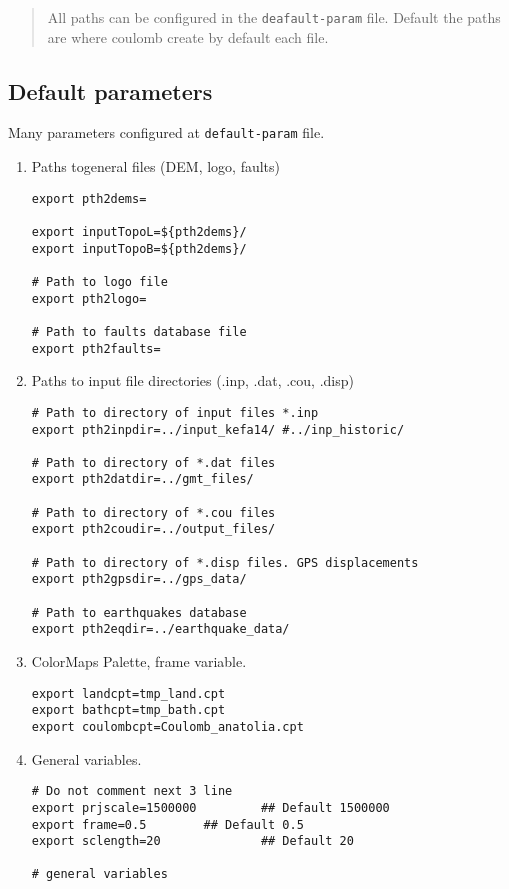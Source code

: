 \begin{quote}
All paths can be configured in the \texttt{deafault-param} file. Default
the paths are where coulomb create by default each file.
\end{quote}

\subsection{Default parameters}\label{default-parameters}

Many parameters configured at \texttt{default-param} file. 
\begin{enumerate}
\item  Paths togeneral files (DEM, logo, faults) 
\begin{verbatim}
export pth2dems=

export inputTopoL=${pth2dems}/
export inputTopoB=${pth2dems}/

# Path to logo file
export pth2logo=

# Path to faults database file
export pth2faults=
\end{verbatim}
\item Paths to input file directories (.inp, .dat, .cou, .disp)
\begin{verbatim}
# Path to directory of input files *.inp
export pth2inpdir=../input_kefa14/ #../inp_historic/

# Path to directory of *.dat files
export pth2datdir=../gmt_files/

# Path to directory of *.cou files
export pth2coudir=../output_files/

# Path to directory of *.disp files. GPS displacements
export pth2gpsdir=../gps_data/

# Path to earthquakes database
export pth2eqdir=../earthquake_data/

\end{verbatim} 
\item ColorMaps Palette, frame variable. 
\begin{verbatim}
export landcpt=tmp_land.cpt
export bathcpt=tmp_bath.cpt
export coulombcpt=Coulomb_anatolia.cpt
\end{verbatim}
\item General variables.
\begin{verbatim}
# Do not comment next 3 line
export prjscale=1500000         ## Default 1500000
export frame=0.5		## Default 0.5
export sclength=20              ## Default 20

# general variables


\end{verbatim}
\end{enumerate}
